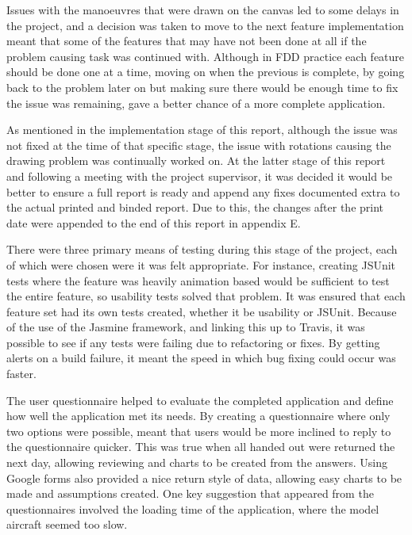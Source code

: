 Issues with the manoeuvres that were drawn on the canvas led to some delays in the project, and a decision was taken to move to the next feature implementation meant that some of the features that may have not been done at all if the problem causing task was continued with. Although in FDD practice each feature should be done one at a time, moving on when the previous is complete, by going back to the problem later on but making sure there would be enough time to fix the issue was remaining, gave a better chance of a more complete application.

As mentioned in the implementation stage of this report, although the issue was not fixed at the time of that specific stage, the issue with rotations causing the drawing problem was continually worked on. At the latter stage of this report and following a meeting with the project supervisor, it was decided it would be better to ensure a full report is ready and append any fixes documented extra to the actual printed and binded report. Due to this, the changes after the print date were appended to the end of this report in appendix E. 

There were three primary means of testing during this stage of the project, each of which were chosen were it was felt appropriate. For instance, creating JSUnit tests where the feature was heavily animation based would be sufficient to test the entire feature, so usability tests solved that problem. It was ensured that each feature set had its own tests created, whether it be usability or JSUnit. Because of the use of the Jasmine framework, and linking this up to Travis, it was possible to see if any tests were failing due to refactoring or fixes. By getting alerts on a build failure, it meant the speed in which bug fixing could occur was faster.

The user questionnaire helped to evaluate the completed application and define how well the application met its needs. By creating a questionnaire where only two options were possible, meant that users would be more inclined to reply to the questionnaire quicker. This was true when all handed out were returned the next day, allowing reviewing and charts to be created from the answers. Using Google forms also provided a nice return style of data, allowing easy charts to be made and assumptions created. One key suggestion that appeared from the questionnaires involved the loading time of the application, where the model aircraft seemed too slow.

